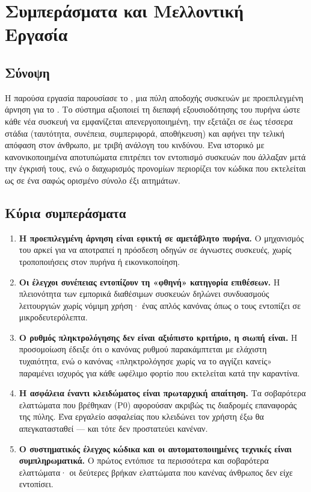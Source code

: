 \chapter{Συμπεράσματα και Μελλοντική Εργασία}
\label{ch:conclusions}

\section{Σύνοψη}

Η παρούσα εργασία παρουσίασε το \Probolos, μια πύλη αποδοχής συσκευών 
με προεπιλεγμένη άρνηση για το . Το σύστημα αξιοποιεί τη διεπαφή
εξουσιοδότησης του πυρήνα ώστε κάθε νέα συσκευή να εμφανίζεται απενεργοποιημένη,
την εξετάζει σε έως τέσσερα στάδια (ταυτότητα, συνέπεια, συμπεριφορά,
αποθήκευση) και αφήνει την τελική απόφαση στον άνθρωπο, με τριβή ανάλογη του
κινδύνου. Ένα ιστορικό με κανονικοποιημένα αποτυπώματα επιτρέπει τον εντοπισμό
συσκευών που άλλαξαν μετά την έγκρισή τους, ενώ ο διαχωρισμός προνομίων
περιορίζει τον κώδικα που εκτελείται ως  σε ένα σαφώς ορισμένο σύνολο
έξι αιτημάτων.

\section{Κύρια συμπεράσματα}

\begin{enumerate}
  \item \textbf{Η προεπιλεγμένη άρνηση είναι εφικτή σε αμετάβλητο πυρήνα.} Ο
        μηχανισμός  του  αρκεί για να
        αποτραπεί η πρόσδεση οδηγών σε άγνωστες συσκευές, χωρίς τροποποιήσεις
        στον πυρήνα ή εικονικοποίηση.
  \item \textbf{Οι έλεγχοι συνέπειας εντοπίζουν τη «φθηνή» κατηγορία
        επιθέσεων.} Η πλειονότητα των εμπορικά διαθέσιμων συσκευών 
        δηλώνει συνδυασμούς λειτουργιών χωρίς νόμιμη χρήση· ένας απλός κανόνας
        όπως ο  τους εντοπίζει σε μικροδευτερόλεπτα.
  \item \textbf{Ο ρυθμός πληκτρολόγησης δεν είναι αξιόπιστο κριτήριο, η
        σιωπή είναι.} Η προσομοίωση έδειξε ότι ο κανόνας ρυθμού παρακάμπτεται
        με ελάχιστη τυχαιότητα, ενώ ο κανόνας «πληκτρολόγησε χωρίς να το
        αγγίζει κανείς» παραμένει ισχυρός για κάθε ωφέλιμο φορτίο που εκτελείται
        κατά την καραντίνα.
  \item \textbf{Η ασφάλεια έναντι κλειδώματος είναι πρωταρχική απαίτηση.} Τα
        σοβαρότερα ελαττώματα που βρέθηκαν (P0) αφορούσαν ακριβώς τις διαδρομές
        επαναφοράς της πύλης. Ένα εργαλείο ασφαλείας που κλειδώνει τον χρήστη
        έξω θα απεγκατασταθεί — και τότε δεν προστατεύει κανέναν.
  \item \textbf{Ο συστηματικός έλεγχος κώδικα και οι αυτοματοποιημένες τεχνικές
        είναι συμπληρωματικά.} Ο πρώτος εντόπισε τα περισσότερα και σοβαρότερα
        ελαττώματα· οι δεύτερες βρήκαν ελαττώματα που κανένας άνθρωπος δεν είχε
        εντοπίσει.
\end{enumerate}

